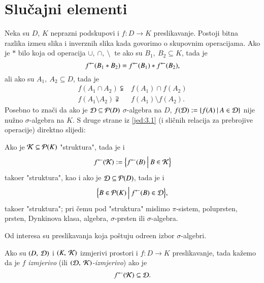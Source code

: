 \usetikzlibrary{arrows,chains,matrix,positioning,scopes}

\chapter{Slu\v cajni elementi} \label{poglavlje3}

Neka su $D$, $K$ neprazni podskupovi i $f: D \to K$ preslikavanje.
Postoji bitna razlika izme\dj u slika i inverznih slika kada govorimo o skupovnim operacijama. Ako je $*$ bilo koja od operacija $\cup, \: \cap, \: \setminus \:$ te ako su $B_1, \: B_2 \subseteq K$, tada je
\begin{equation} \label{jed:3.1}
    {f}^{\leftarrow} (B_1 * B_2) = {f}^{\leftarrow}(B_1) * {f}^{\leftarrow}(B_2),
\end{equation}
ali ako su $A_1, \: A_2 \subseteq D$, tada je
\begin{align*}
    f(A_1 \cap A_2) \subsetneqq& f(A_1) \cap f(A_2) \\
    f(A_1 \setminus A_2) \supsetneqq& f(A_1) \setminus f(A_2). 
\end{align*}
Posebno to zna\v ci da ako je $\mathcal{D} \subseteq \mathcal{P}({D})$ $\sigma$-algebra na $D$, $f(\mathcal{D}) := \{{f(A)} \: | \: {A \in \mathcal{D}}\}$ nije nu\v zno $\sigma$-algebra na $K$.
S druge strane iz \eqref{jed:3.1} (i sli\v cnih relacija za prebrojive operacije) direktno slijedi:

Ako je $\mathcal{K} \subseteq \mathcal{P}({K})$ "struktura", tada je i
\begin{equation} \label{jed:3.2}
    {f}^{\leftarrow}(\mathcal{K}) := \Big\{ {{f}^{\leftarrow}(B)} \: \Big| \: {B \in
        \mathcal{K}} \Big\}
\end{equation}
tako\dj er "struktura", kao i ako je $\mathcal{D} \subseteq \mathcal{P}({D})$, tada je i
\begin{equation} \label{jed:3.3}
    \Big\{ {B \in \mathcal{P}({K})} \: \Big| \: {{f}^{\leftarrow}(B) \in \mathcal{D}} \Big\},
\end{equation}
tako\dj er "struktura"; pri \v cemu pod "struktura" mislimo $\pi$-sistem, poluprsten, prsten, Dynkinova klasa, algebra, $\sigma$-prsten ili $\sigma$-algebra.

Od interesa su preslikavanja koja po\v stuju odre\dj en
izbor $\sigma$-algebri.
\begin{defn}    \label{defn:3.3-1}
    Ako su $(D, \: \mathcal{D})$ i $(K, \: \mathcal{K})$ izmjerivi prostori i $f: D \to K$ preslikavanje, tada ka\v zemo da je $f$ \emph{izmjerivo} (ili \emph{$(\mathcal{D}, \: \mathcal{K})$-izmjerivo}) ako je
    \begin{equation*}
        {f}^{\leftarrow}(\mathcal{K}) \subseteq \mathcal{D}.
    \end{equation*}
\end{defn}

